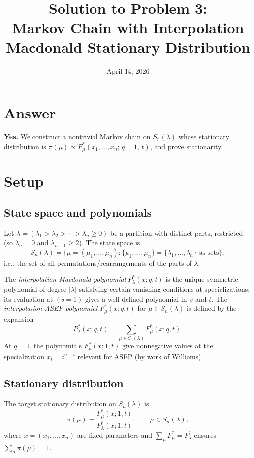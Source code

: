 \documentclass[12pt]{article}
\title{Solution to Problem 3:\\Markov Chain with Interpolation Macdonald Stationary Distribution}
\author{}
\date{April 14, 2026}
\begin{document}
\maketitle

\section*{Answer}

\textbf{Yes.} We construct a nontrivial Markov chain on $S_n(\lambda)$ whose stationary distribution is $\pi(\mu) \propto F^*_\mu(x_1,\ldots,x_n;\,q=1,\,t)$, and prove stationarity.

\section*{Setup}

\subsection*{State space and polynomials}

Let $\lambda = (\lambda_1 > \lambda_2 > \cdots > \lambda_n \geq 0)$ be a partition with distinct parts, restricted (so $\lambda_n = 0$ and $\lambda_{n-1} \geq 2$).  The state space is
\[
  S_n(\lambda) = \{\mu = (\mu_1,\ldots,\mu_n) : \{\mu_1,\ldots,\mu_n\} = \{\lambda_1,\ldots,\lambda_n\}\text{ as sets}\},
\]
i.e., the set of all permutations/rearrangements of the parts of $\lambda$.

The \emph{interpolation Macdonald polynomial} $P^*_\lambda(x;q,t)$ is the unique symmetric polynomial of degree $|\lambda|$ satisfying certain vanishing conditions at specializations; its evaluation at $(q=1)$ gives a well-defined polynomial in $x$ and $t$.  The \emph{interpolation ASEP polynomial} $F^*_\mu(x;q,t)$ for $\mu \in S_n(\lambda)$ is defined by the expansion
\[
  P^*_\lambda(x;q,t) = \sum_{\mu \in S_n(\lambda)} F^*_\mu(x;q,t).
\]
At $q=1$, the polynomials $F^*_\mu(x;1,t)$ give nonnegative values at the specialization $x_i = t^{n-i}$ relevant for ASEP (by work of Williams).

\subsection*{Stationary distribution}

The target stationary distribution on $S_n(\lambda)$ is
\[
  \pi(\mu) = \frac{F^*_\mu(x;1,t)}{P^*_\lambda(x;1,t)}, \qquad \mu \in S_n(\lambda),
\]
where $x = (x_1,\ldots,x_n)$ are fixed parameters and $\sum_\mu F^*_\mu = P^*_\lambda$ ensures $\sum_\mu \pi(\mu) = 1$.
\end{document}
